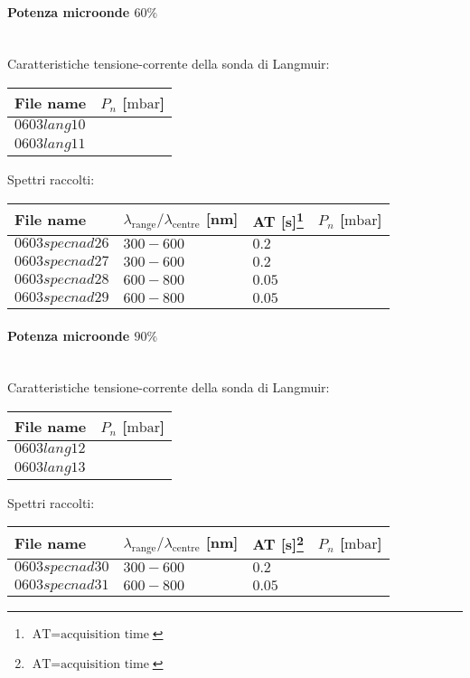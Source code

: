 \paragraph*{Potenza microonde $\text{60\%}$} ~\\
Caratteristiche tensione-corrente della sonda di Langmuir:
\begin{center}
\begin{tabular}{p{3cm}p{3cm}}
\toprule
File name	&$P_n$ [$\si{\milli\bar}$]\\
\midrule
$0603lang10$	&$  $\\
$0603lang11$	&$  $\\
\bottomrule
\end{tabular}
\end{center}

Spettri raccolti:
\begin{center}
\begin{tabular}{p{3cm}p{4cm}p{2cm}p{3cm}}
\toprule
File name	&$\lambda_\text{range}\text{/}\lambda_\text{centre}$ [nm] 	&AT [s]\footnote{$\text{AT}=\text{acquisition time}$} &$P_n$ [$\si{\milli\bar}$]\\
\midrule
$0603specnad26$	&$300-600$	&$0.2$		&$  $\\
$0603specnad27$	&$300-600$	&$0.2$		&$  $\\
$0603specnad28$	&$600-800$	&$0.05$		&$  $\\
$0603specnad29$	&$600-800$	&$0.05$		&$  $\\
\bottomrule
\end{tabular}
\end{center}

\paragraph*{Potenza microonde $\text{90\%}$} ~\\
Caratteristiche tensione-corrente della sonda di Langmuir:
\begin{center}
\begin{tabular}{p{3cm}p{3cm}}
\toprule
File name	&$P_n$ [$\si{\milli\bar}$]\\
\midrule
$0603lang12$	&$  $\\
$0603lang13$	&$  $\\
\bottomrule
\end{tabular}
\end{center}

Spettri raccolti:
\begin{center}
\begin{tabular}{p{3cm}p{4cm}p{2cm}p{3cm}}
\toprule
File name	&$\lambda_\text{range}\text{/}\lambda_\text{centre}$ [nm] 	&AT [s]\footnote{$\text{AT}=\text{acquisition time}$} &$P_n$ [$\si{\milli\bar}$]\\
\midrule
$0603specnad30$	&$300-600$	&$0.2$		&$  $\\
$0603specnad31$	&$600-800$	&$0.05$		&$  $\\
\bottomrule
\end{tabular}
\end{center}

